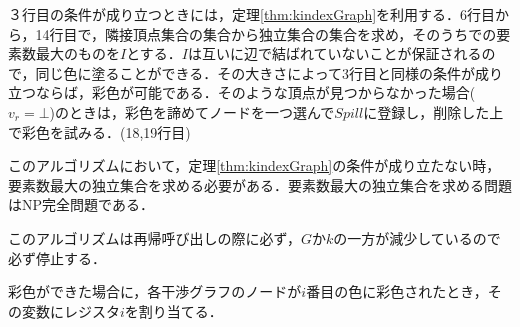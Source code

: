 \documentclass[dvipdfmx,a4j]{jbook}
\begin{document}
３行目の条件が成り立つときには，定理\ref{thm:kindexGraph}を利用する．6行目から，14行目で，隣接頂点集合の集合から独立集合の集合を求め，そのうちでの要素数最大のものを$I$とする．$I$は互いに辺で結ばれていないことが保証されるので，同じ色に塗ることができる．その大きさによって3行目と同様の条件が成り立つならば，彩色が可能である．そのような頂点が見つからなかった場合($v_r=\bot$)のときは，彩色を諦めてノードを一つ選んで$Spill$に登録し，削除した上で彩色を試みる．(18,19行目)

このアルゴリズムにおいて，定理\ref{thm:kindexGraph}の条件が成り立たない時，要素数最大の独立集合を求める必要がある．要素数最大の独立集合を求める問題はNP完全問題である．

このアルゴリズムは再帰呼び出しの際に必ず，$G$か$k$の一方が減少しているので必ず停止する．

彩色ができた場合に，各干渉グラフのノードが$i$番目の色に彩色されたとき，その変数にレジスタ$i$を割り当てる．
\end{document}

